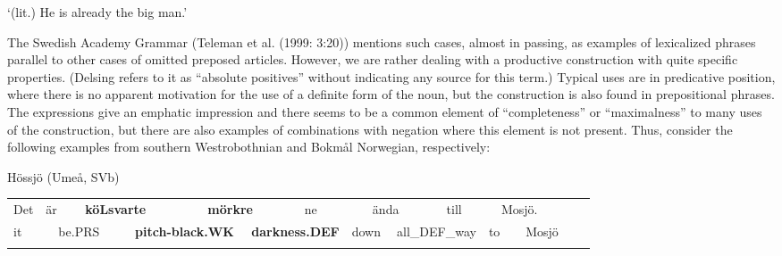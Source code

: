 \begin{styleTranslation}
‘(lit.) He is already the big man.’

\end{styleTranslation}

\begin{styleBodyTextFirst}
The Swedish Academy Grammar (Teleman et al. (1999: 3:20)) mentions such cases, almost in passing, as examples of lexicalized phrases parallel to other cases of omitted preposed articles. However, we are rather dealing with a productive construction with quite specific properties. (Delsing refers to it as “absolute positives” without indicating any source for this term.) Typical uses are in predicative position, where there is no apparent motivation for the use of a definite form of the noun, but the construction is also found in prepositional phrases. The expressions give an emphatic impression and there seems to be a common element of “completeness” or “maximalness” to many uses of the construction, but there are also examples of combinations with negation where this element is not present. Thus, consider the following examples from southern Westrobothnian and Bokmål Norwegian, respectively: 

\end{styleBodyTextFirst}

\begin{listWWNumileveli}
\item {}

\begin{styleExample}
Hössjö (Umeå, SVb)

\end{styleExample}

\end{listWWNumileveli}

\begin{tabular}{llllllllllllllllll}
\lsptoprule
Det & \multicolumn{2}{l}{är

} & \multicolumn{2}{l}{{\bfseries köLsvarte}

} & \multicolumn{2}{l}{{\bfseries mörkre}

} & \multicolumn{2}{l}{ne

} & \multicolumn{2}{l}{ända

} & \multicolumn{2}{l}{till

} & \multicolumn{2}{l}{Mosjö.

} & \multicolumn{2}{l}{} & \\
\multicolumn{2}{l}{it

} & \multicolumn{2}{l}{be.PRS

} & \multicolumn{2}{l}{{\bfseries pitch-black.WK}

} & \multicolumn{2}{l}{{\bfseries darkness.DEF}

} & \multicolumn{2}{l}{down

} & \multicolumn{2}{l}{all\_DEF\_way

} & \multicolumn{2}{l}{to

} & \multicolumn{2}{l}{Mosjö

} & \multicolumn{2}{l}{}\\
\lspbottomrule
\end{tabular}

